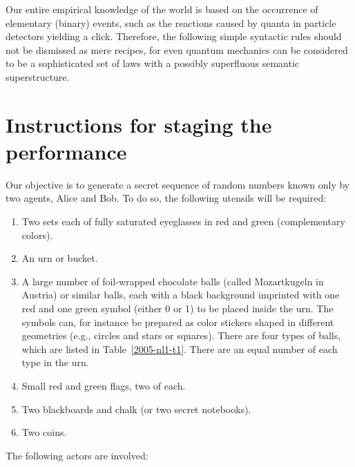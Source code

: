 \documentclass[prb,amssymb,preprint]{revtex4}
\begin{document}
Our entire empirical knowledge of the world is based on the occurrence of
elementary (binary) events, such as the reactions caused by quanta in
particle detectors yielding a click. Therefore, the following simple
syntactic rules should not be dismissed as
mere recipes, for even quantum mechanics can be
considered to be a
sophisticated set of laws with a possibly superfluous\cite{fuchs-peres}
semantic superstructure.

\section{Instructions for staging the performance}

Our objective is to generate a secret sequence of random numbers known only
by two agents, Alice and Bob. To do so, the following
utensils will be required:

\begin{enumerate}

\item Two sets each of fully saturated eyeglasses in red and green
(complementary colors).

\item An urn or bucket.

\item A large number of foil-wrapped chocolate balls (called
Mozartkugeln in Austria) or similar balls, each with a black background
imprinted with one red and one green symbol (either 0 or 1) to be placed
inside the urn.
The symbols can, for instance be prepared as color stickers shaped in different geometries
(e.g., circles and stars or squares).
There are four types of
balls, which are listed in Table~\ref{2005-nl1-t1}. There are an equal
number of each type in the urn.

\item Small red and green flags, two of each.

\item Two blackboards and chalk (or two secret notebooks).

\item Two coins.

\end{enumerate}

The following actors are involved:
\end{document}
